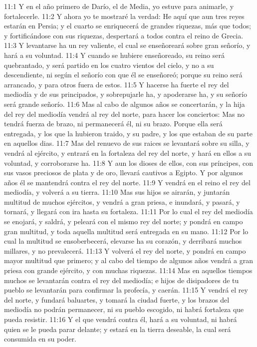 11:1 Y en el año primero de Darío, el de Media, yo estuve para animarle, y fortalecerle.
11:2 Y ahora yo te mostraré la verdad: He aquí que aun tres reyes estarán en Persia; y el cuarto se enriquecerá de grandes riquezas, más que todos; y fortificándose con sus riquezas, despertará a todos contra el reino de Grecia.
11:3 Y levantarse ha un rey valiente, el cual se enseñoreará sobre gran señorío, y hará a su voluntad.
11:4 Y cuando se hubiere enseñoreado, su reino será quebrantado, y será partido en los cuatro vientos del cielo, y no a su descendiente, ni según el señorío con que él se enseñoreó; porque su reino será arrancado, y para otros fuera de estos.
11:5 Y hacerse ha fuerte el rey del mediodía y de sus principados, y sobrepujarle ha, y apoderarse ha, y su señorío será grande señorío.
11:6 Mas al cabo de algunos años se concertarán, y la hija del rey del mediodía vendrá al rey del norte, para hacer los conciertos: Mas no tendrá fuerza de brazo, ni permanecerá él, ni su brazo. Porque ella será entregada, y los que la hubieron traido, y su padre, y los que estaban de su parte en aquellos dias.
11:7 Mas del renuevo de sus raices se levantará sobre su silla, y vendrá al ejército, y entrará en la fortaleza del rey del norte, y hará en ellos a su voluntad, y corroborarse ha.
11:8 Y aun los dioses de ellos, con sus príncipes, con sus vasos preciosos de plata y de oro, llevará cautivos a Egipto. Y por algunos años él se mantendrá contra el rey del norte.
11:9 Y vendrá en el reino el rey del mediodía, y volverá a su tierra.
11:10 Mas sus hijos se airarán, y juntarán multitud de muchos ejércitos, y vendrá a gran priesa, e inundará, y pasará, y tornará, y llegará con ira hasta su fortaleza.
11:11 Por lo cual el rey del mediodía se enojará, y saldrá, y peleará con el mismo rey del norte; y pondrá en campo gran multitud, y toda aquella multitud será entregada en su mano.
11:12 Por lo cual la multitud se ensoberbecerá, elevarse ha su corazón, y derribará muchos millares, y no prevalecerá.
11:13 Y volverá el rey del norte, y pondrá en campo mayor multitud que primero; y al cabo del tiempo de algunos años vendrá a gran priesa con grande ejército, y con muchas riquezas.
11:14 Mas en aquellos tiempos muchos se levantarán contra el rey del mediodía; e hijos de disipadores de tu pueblo se levantarán para confirmar la profecía, y caerán.
11:15 Y vendrá el rey del norte, y fundará baluartes, y tomará la ciudad fuerte, y los brazos del mediodía no podrán permanecer, ni su pueblo escogido, ni habrá fortaleza que pueda resistir.
11:16 Y el que vendrá contra él, hará a su voluntad, ni habrá quien se le pueda parar delante; y estará en la tierra deseable, la cual será consumida en su poder.
